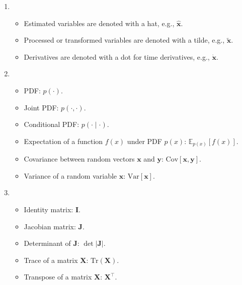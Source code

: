 \begin{enumerate}[label=\textbf{\arabic*.}, wide=0pt, leftmargin=*, labelsep=1em]
    \item[Variable modifications]\mbox{}\\[-1em] 
    \begin{itemize}[itemsep=1em]
        \setlength\itemsep{1em}     %
        \setlength\parsep{0em}      %
        \item Estimated variables are denoted with a hat, e.g., $\hat{\boldsymbol{x}}$.
        \item Processed or transformed variables are denoted with a tilde, e.g., $\tilde{\boldsymbol{x}}$.
        \item Derivatives are denoted with a dot for time derivatives, e.g., $\dot{\boldsymbol{x}}$.
    \end{itemize}

    \item[Probability and statistics]\mbox{}\\[-1em] 
    \begin{itemize}[itemsep=0.5em]
        \setlength\itemsep{1em}     %
        \setlength\parsep{0em}      %
        \item \acf{PDF}: $p(\cdot)$.
        \item Joint PDF: $p(\cdot, \cdot)$.
        \item Conditional PDF: $p(\cdot \mid \cdot)$.
        \item Expectation of a function $f(x)$ under PDF $p(x)$: $\mathbb{E}_{p(x)}[f(x)]$.
        \item Covariance between random vectors $\boldsymbol{x}$ and $\boldsymbol{y}$: $\text{Cov}[\boldsymbol{x}, \boldsymbol{y}]$.
        \item Variance of a random variable $\boldsymbol{x}$: $\text{Var}[\boldsymbol{x}]$.
    \end{itemize}

    \item[Matrix operations]\mbox{}\\[-1em] 
    \begin{itemize}
        \setlength\itemsep{1em}     %
        \setlength\parsep{0em}      %
        \item Identity matrix: $\boldsymbol{I}$.
        \item Jacobian matrix: $\boldsymbol{J}$.
        \item Determinant of $\boldsymbol{J}$: $\det|\boldsymbol{J}|$.
        \item Trace of a matrix $\boldsymbol{X}$: $\text{Tr}(\boldsymbol{X})$.
        \item Transpose of a matrix $\boldsymbol{X}$: $\boldsymbol{X}^\top$.
    \end{itemize}
\end{enumerate}

